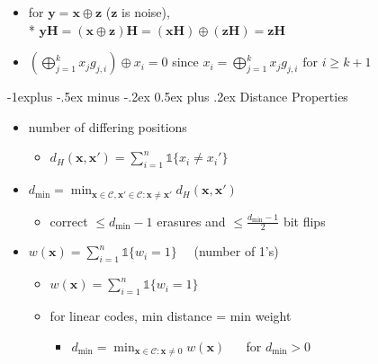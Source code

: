 \documentclass[10pt, landscape]{article}
\makeatletter
\renewcommand{\subsection}{\@startsection{subsection}{2}{0mm}%
  {-1explus -.5ex minus -.2ex}%
  {0.5ex plus .2ex}%
{\normalfont\normalsize\bfseries}}
\makeatother
\begin{document}
\begin{multicols*}{4}
  \begin{itemize}
    \item for $\mathbf{y=x\oplus z}$  ($\mathbf{z}$ is noise),
      \\* $\mathbf{yH} = (\mathbf{x}\oplus\mathbf{z})\mathbf{H} = \mathbf{(xH) \oplus (zH)} = \mathbf{zH}$
    \item $\left( \bigoplus^k_{j=1} x_j g_{j,i} \right) \oplus x_i = 0 $ since
      $\scriptscriptstyle x_i =  \bigoplus^k_{j=1} x_j g_{j,i}\text{ for } i\geq k+1$
  \end{itemize}


  \subsection{Distance Properties}

  \begin{itemize}
    \item {} number of differing positions
      \begin{itemize}
        \item $d_H(\mathbf{x}, \mathbf{x}') = \sum^n_{i=1} \mathds{1}\{x_i \neq x_i'\}$
      \end{itemize}
    \item {} 
      \( {\displaystyle{ d_{\min} = \min_{\mathbf{x} \in \mathcal{C}, \mathbf{x}' \in \mathcal{C}: \mathbf{x} \neq \mathbf{x}'} d_H (\mathbf{x}, \mathbf{x'}) }} \) 
      \begin{itemize}
        \item correct $\leq d_{\min} - 1$ erasures and $\leq \frac{d_{\min}-1}{2}$ bit flips
      \end{itemize}
    \item {} $w(\mathbf{x}) = \sum^n_{i=1} \mathds{1}\{w_i=1\} \quad$ (number of 1's)
      \begin{itemize}
        \item $w(\mathbf{x}) = \sum^n_{i=1} \mathds{1}\{w_i=1\}$
        \item for linear codes, min distance = min weight
          \begin{itemize}
            \item  \( {\displaystyle{ d_{\min} = \min_{\mathbf{x} \in \mathcal{C}: \mathbf{x} \neq 0} w(\mathbf{x}) }} \) 
              $\quad$ for $d_{\min} > 0$
          \end{itemize}
      \end{itemize}
  \end{itemize}


\end{multicols*}
\end{document}
